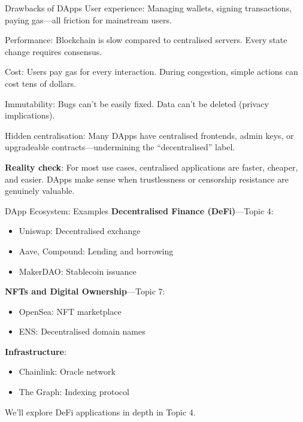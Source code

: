 \documentclass[10pt]{beamer}
\newcommand{\bad}[1]{\textcolor{AccentOrange}{#1}}
\begin{document}
\begin{frame}{Drawbacks of DApps}
  \bad{User experience}: Managing wallets, signing transactions, paying gas---all friction for mainstream users.
  
  \vspace{0.5em}
  \bad{Performance}: Blockchain is slow compared to centralised servers. Every state change requires consensus.
  
  \vspace{0.5em}
  \bad{Cost}: Users pay gas for every interaction. During congestion, simple actions can cost tens of dollars.
  
  \vspace{0.5em}
  \bad{Immutability}: Bugs can't be easily fixed. Data can't be deleted (privacy implications).
  
  \vspace{0.5em}
  \bad{Hidden centralisation}: Many DApps have centralised frontends, admin keys, or upgradeable contracts---undermining the ``decentralised'' label.
  
  \vspace{1em}
  \textbf{Reality check}: For most use cases, centralised applications are faster, cheaper, and easier. DApps make sense when trustlessness or censorship resistance are genuinely valuable.
\end{frame}

\begin{frame}{DApp Ecosystem: Examples}
  \textbf{Decentralised Finance (DeFi)}---Topic 4:
  \begin{itemize}
    \item Uniswap: Decentralised exchange
    \item Aave, Compound: Lending and borrowing
    \item MakerDAO: Stablecoin issuance
  \end{itemize}
  
  \vspace{0.5em}
  \textbf{NFTs and Digital Ownership}---Topic 7:
  \begin{itemize}
    \item OpenSea: NFT marketplace
    \item ENS: Decentralised domain names
  \end{itemize}
  
  \vspace{0.5em}
  \textbf{Infrastructure}:
  \begin{itemize}
    \item Chainlink: Oracle network
    \item The Graph: Indexing protocol
  \end{itemize}
  
  \vspace{0.5em}
  We'll explore DeFi applications in depth in Topic 4.
\end{frame}
\end{document}
